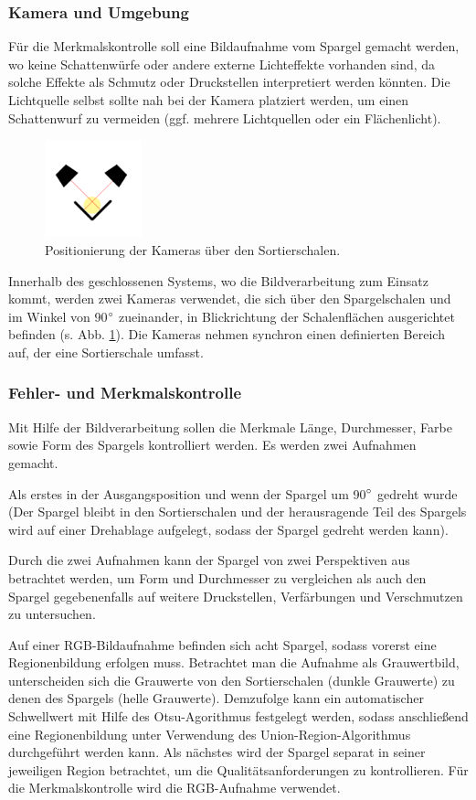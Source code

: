 \documentclass{ezb}
\begin{document}
\subsubsection*{Kamera und Umgebung}
Für die Merkmalskontrolle soll eine Bildaufnahme vom Spargel gemacht werden, wo keine Schattenwürfe oder andere externe Lichteffekte vorhanden sind, da solche Effekte als Schmutz oder Druckstellen interpretiert werden könnten. Die Lichtquelle selbst sollte nah bei der Kamera platziert werden, um einen Schattenwurf zu vermeiden (ggf. mehrere Lichtquellen oder ein Flächenlicht).\\
\begin{figure}
\includegraphics[width=0.25\textwidth]{kameras.png}
\caption{\label{fig:kameras}Positionierung der Kameras über den Sortierschalen.}
\end{figure}
Innerhalb des geschlossenen Systems, wo die Bildverarbeitung zum Einsatz kommt, werden zwei Kameras verwendet, die sich über den Spargelschalen und im Winkel von 90$\degree$ zueinander, in Blickrichtung der Schalenflächen ausgerichtet befinden (s. Abb. \ref{fig:kameras}). Die Kameras nehmen synchron einen definierten Bereich auf, der eine Sortierschale umfasst.
\clearpage
\subsubsection*{Fehler- und Merkmalskontrolle}
Mit Hilfe der Bildverarbeitung sollen die Merkmale Länge, Durchmesser, Farbe sowie Form des Spargels kontrolliert werden. Es werden zwei Aufnahmen gemacht.

Als erstes in der Ausgangsposition und wenn der Spargel um 90$\degree$ gedreht wurde (Der Spargel bleibt in den Sortierschalen und der herausragende Teil des Spargels wird auf einer Drehablage aufgelegt, sodass der Spargel gedreht werden kann).

Durch die zwei Aufnahmen kann der Spargel von zwei Perspektiven aus betrachtet werden, um Form und Durchmesser zu vergleichen als auch den Spargel gegebenenfalls auf weitere Druckstellen, Verfärbungen und Verschmutzen zu untersuchen.

Auf einer RGB-Bildaufnahme befinden sich acht Spargel, sodass vorerst eine Regionenbildung erfolgen muss. Betrachtet man die Aufnahme als Grauwertbild, unterscheiden sich die Grauwerte von den Sortierschalen (dunkle Grauwerte) zu denen des Spargels (helle Grauwerte). Demzufolge kann ein automatischer Schwellwert mit Hilfe des Otsu-Agorithmus festgelegt werden, sodass anschließend eine Regionenbildung unter Verwendung des Union-Region-Algorithmus durchgeführt werden kann. Als nächstes wird der Spargel separat in seiner jeweiligen Region betrachtet, um die Qualitätsanforderungen zu kontrollieren. Für die Merkmalskontrolle wird die RGB-Aufnahme verwendet.
\end{document}
